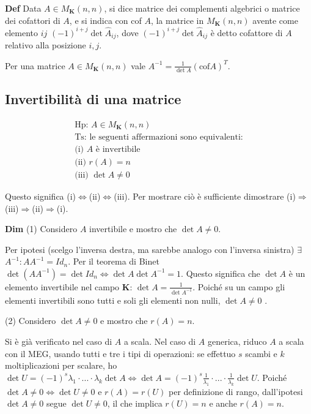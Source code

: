 \documentclass{article}
\begin{document}
\textbf{Def} Data $A\in M_{\mathbf{K}}\left( n,n\right) $, si dice matrice
dei complementi algebrici o matrice dei cofattori di $A$, e si indica con cof%
$A$, la matrice in $M_{\mathbf{K}}\left( n,n\right) $ avente come elemento $%
ij$ $\left( -1\right) ^{i+j}\det \hat{A}_{ij}$, dove $\left( -1\right)
^{i+j}\det \hat{A}_{ij}$ \`{e} detto cofattore di $A$ relativo alla
posizione $i,j$.

Per una matrice $A\in M_{\mathbf{K}}\left( n,n\right) $ vale $A^{-1}=\frac{1%
}{\det A}\left( \text{cof}A\right) ^{T}$.

\subsection{Invertibilit\`{a} di una matrice}

\begin{gather*}
\text{Hp}\text{: }A\in M_{\mathbf{K}}\left( n,n\right) \\
\text{Ts}\text{: le seguenti affermazioni sono equivalenti:} \\
\text{(i) }A\text{ \`{e} invertibile} \\
\text{(ii) }r\left( A\right) =n \\
\text{(iii) }\det A\neq 0
\end{gather*}

Questo significa (i)$\Longleftrightarrow $(ii)$\Longleftrightarrow $(iii).
Per mostrare ci\`{o} \`{e} sufficiente dimostrare (i)$\Longrightarrow $(iii)$%
\Longrightarrow $(ii)$\Longrightarrow $(i).

\textbf{Dim} (1) Considero $A$ invertibile e mostro che $\det A\neq 0$.

Per ipotesi (scelgo l'inversa destra, ma sarebbe analogo con l'inversa
sinistra) $\exists $ $A^{-1}:AA^{-1}=Id_{n}$. Per il teorema di Binet $\det
\left( AA^{-1}\right) =\det Id_{n}\Longleftrightarrow \det A\det A^{-1}=1$.
Questo significa che $\det A$ \`{e} un elemento invertibile nel campo $%
\mathbf{K}$: $\det A=\frac{1}{\det A^{-1}}$. Poich\'{e} su un campo gli
elementi invertibili sono tutti e soli gli elementi non nulli, $\det A\neq 0$%
.

(2) Considero $\det A\neq 0$ e mostro che $r\left( A\right) =n$.

Si \`{e} gi\`{a} verificato nel caso di $A$ a scala. Nel caso di $A$
generica, riduco $A$ a scala con il MEG, usando tutti e tre i tipi di
operazioni: se effettuo $s$ scambi e $k$ moltiplicazioni per scalare, ho $%
\det U=\left( -1\right) ^{s}\lambda _{1}\cdot ...\cdot \lambda _{k}\det
A\Longleftrightarrow \det A=\left( -1\right) ^{s}\frac{1}{\lambda _{1}}\cdot
...\cdot \frac{1}{\lambda _{k}}\det U$. Poich\'{e} $\det A\neq
0\Longleftrightarrow \det U\neq 0$ e $r\left( A\right) =r\left( U\right) $
per definizione di rango, dall'ipotesi $\det A\neq 0$ segue $\det U\neq 0$,
il che implica $r\left( U\right) =n$ e anche $r\left( A\right) =n$.
\end{document}
